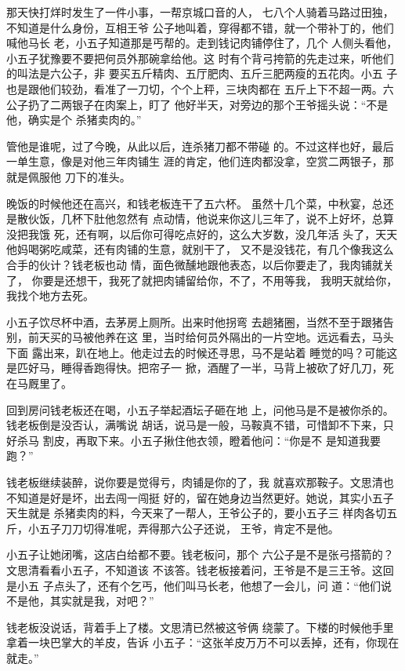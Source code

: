 那天快打烊时发生了一件小事，一帮京城口音的人，
七八个人骑着马路过田独，不知道是什么身份，互相王爷
公子地叫着，穿得都不错，就一个带补丁的，他们喊他马长
老，小五子知道那是丐帮的。走到钱记肉铺停住了，几个
人侧头看他，小五子犹豫要不要把何员外那碗拿给他。这
时有个背弓挎箭的先走过来，听他们的叫法是六公子，非
要买五斤精肉、五厅肥肉、五斤三肥两瘦的五花肉。小五
子也是跟他们较劲，看准了一刀切，个个上秤，三块肉都在
五斤上下不超一两。六公子扔了二两银子在肉案上，盯了
他好半天，对旁边的那个王爷摇头说：“不是他，确实是个
杀猪卖肉的。”

管他是谁呢，过了今晚，从此以后，连杀猪刀都不带碰
的。不过这样也好，最后一单生意，像是对他三年肉铺生
涯的肯定，他们连肉都没拿，空赏二两银子，那就是佩服他
刀下的准头。

晚饭的时候他还在高兴，和钱老板连干了五六杯。
虽然十几个菜，中秋宴，总还是散伙饭，几杯下肚他忽然有
点动情，他说来你这儿三年了，说不上好坏，总算没把我饿
死，还有啊，以后你可得吃点好的，这么大岁数，没几年活
头了，天天他妈喝粥吃咸菜，还有肉铺的生意，就别干了，
又不是没钱花，有几个像我这么合手的伙计？钱老板也动
情，面色微醺地跟他表态，以后你要走了，我肉铺就关了，
你要是还想干，我死了就把肉铺留给你，不了，不用等我，
我明天就给你，我找个地方去死。

小五子饮尽杯中酒，去茅房上厕所。出来时他拐弯
去趟猪圈，当然不至于跟猪告别，前天买的马被他养在这
里，当时给何员外隔出的一片空地。远远看去，马头下面
露出来，趴在地上。他走过去的时候还寻思，马不是站着
睡觉的吗？可能这是匹好马，睡得香跑得快。把帘子一
掀，酒醒了一半，马背上被砍了好几刀，死在马厩里了。

回到房问钱老板还在喝，小五子举起酒坛子砸在地
上，问他马是不是被你杀的。钱老板倒是没否认，满嘴说
胡话，说马是一般，马鞍真不错，可惜卸不下来，只好杀马
割皮，再取下来。小五子揪住他衣领，瞪着他问：“你是不
是知道我要跑？”

钱老板继续装醉，说你要是觉得亏，肉铺是你的了，我
就喜欢那鞍子。文思清也不知道是好是坏，出去闯一闯挺
好的，留在她身边当然更好。她说，其实小五子天生就是
杀猪卖肉的料，今天来了一帮人，王爷公子的，要小五子三
样肉各切五斤，小五子刀刀切得准呢，弄得那六公子还说，
王爷，肯定不是他。

小五子让她闭嘴，这店白给都不要。钱老板问，那个
六公子是不是张弓搭箭的？文思清看看小五子，不知道该
不该答。钱老板接着问，王爷是不是三王爷。这回是小五
子点头了，还有个乞丐，他们叫马长老，他想了一会儿，问
道：“他们说不是他，其实就是我，对吧？”

钱老板没说话，背着手上了楼。文思清已然被这爷俩
绕蒙了。下楼的时候他手里拿着一块巴掌大的羊皮，告诉
小五子：“这张羊皮万万不可以丢掉，还有，你现在就走。”

